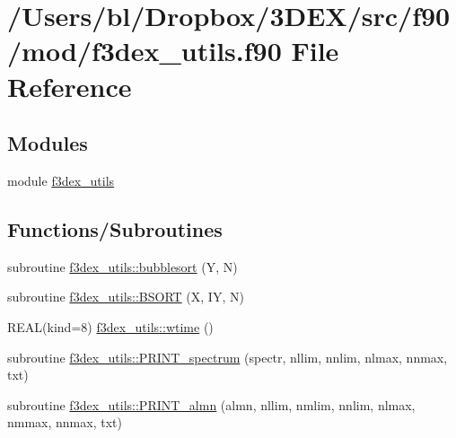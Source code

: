\hypertarget{f3dex__utils_8f90}{
\section{/Users/bl/Dropbox/3DEX/src/f90/mod/f3dex\_\-utils.f90 File Reference}
\label{f3dex__utils_8f90}
}
\subsection*{Modules}
\begin{DoxyCompactItemize}
\item 
module \hyperlink{namespacef3dex__utils}{f3dex\_\-utils}
\end{DoxyCompactItemize}
\subsection*{Functions/Subroutines}
\begin{DoxyCompactItemize}
\item 
subroutine \hyperlink{namespacef3dex__utils_aa75468d58041cdc91e52ce3fadb073b3}{f3dex\_\-utils::bubblesort} (Y, N)
\item 
subroutine \hyperlink{namespacef3dex__utils_a2cce76cb1a695da8315cbf60507ec322}{f3dex\_\-utils::BSORT} (X, IY, N)
\item 
REAL(kind=8) \hyperlink{namespacef3dex__utils_ac5aa172010ec6cd9bd4c5273904b0405}{f3dex\_\-utils::wtime} ()
\item 
subroutine \hyperlink{namespacef3dex__utils_a8b9740b049b3d24092401ae075810f51}{f3dex\_\-utils::PRINT\_\-spectrum} (spectr, nllim, nnlim, nlmax, nnmax, txt)
\item 
subroutine \hyperlink{namespacef3dex__utils_aeba2230de9ec307ae71577d102a0d91d}{f3dex\_\-utils::PRINT\_\-almn} (almn, nllim, nmlim, nnlim, nlmax, nmmax, nnmax, txt)
\end{DoxyCompactItemize}
